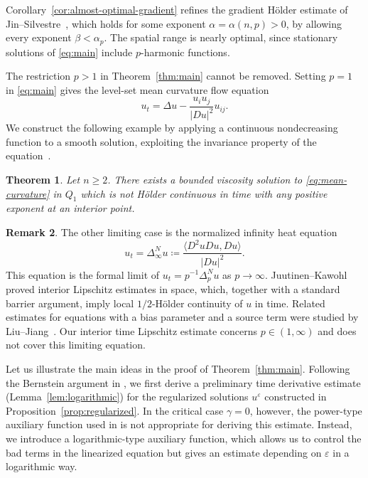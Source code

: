 \documentclass[a4paper,11pt]{amsart}
\theoremstyle{plain}
\newtheorem{theorem}{Theorem}[section]
\theoremstyle{definition}
\newtheorem{remark}[theorem]{Remark}
\numberwithin{equation}{section}
\begin{document}
Corollary~\ref{cor:almost-optimal-gradient} refines the gradient H\"older estimate of Jin--Silvestre~\cite{JS17}, which holds for some exponent $\alpha=\alpha(n,p)>0$, by allowing every exponent $\beta<\alpha_p$. The spatial range is nearly optimal, since stationary solutions of \eqref{eq:main} include $p$-harmonic functions.

The restriction $p>1$ in Theorem~\ref{thm:main} cannot be removed. Setting $p=1$ in \eqref{eq:main} gives the level-set mean curvature flow equation
\begin{equation}\label{eq:mean-curvature}
 u_t=\Delta u-\frac{u_i u_j}{|Du|^2}u_{ij}.
\end{equation}
We construct the following example by applying a continuous nondecreasing function to a smooth solution, exploiting the invariance property of the equation~\cite{CGG91,Gig06}. 

\begin{theorem}\label{thm:p-one}
Let $n\geq2$. There exists a bounded viscosity solution to \eqref{eq:mean-curvature} in $Q_1$ which is not H\"older continuous in time with any positive exponent at an interior point.
\end{theorem}

\begin{remark}
The other limiting case is the normalized infinity heat equation
\begin{equation*}
u_t=\Delta_\infty^N u \coloneqq \frac{\langle D^2uDu,Du\rangle}{|Du|^2}.
\end{equation*}
This equation is the formal limit of $u_t=p^{-1}\Delta_p^N u$ as $p\to\infty$. Juutinen--Kawohl~\cite{JK06} proved interior Lipschitz estimates in space, which, together with a standard barrier argument, imply local $1/2$-H\"older continuity of $u$ in time. Related estimates for equations with a bias parameter and a source term were studied by Liu--Jiang~\cite{LJ19}. Our interior time Lipschitz estimate concerns $p \in (1, \infty)$ and does not cover this limiting equation.
\end{remark}

Let us illustrate the main ideas in the proof of Theorem~\ref{thm:main}. Following the Bernstein argument in \cite{LLYZ25}, we first derive a preliminary time derivative estimate (Lemma~\ref{lem:logarithmic}) for the regularized solutions $u^\varepsilon$ constructed in Proposition~\ref{prop:regularized}. In the critical case $\gamma=0$, however, the power-type auxiliary function used in \cite{LLYZ25} is not appropriate for deriving this estimate. Instead, we introduce a logarithmic-type auxiliary function, which allows us to control the bad terms in the linearized equation but gives an estimate depending on $\varepsilon$ in a logarithmic way.
\end{document}
